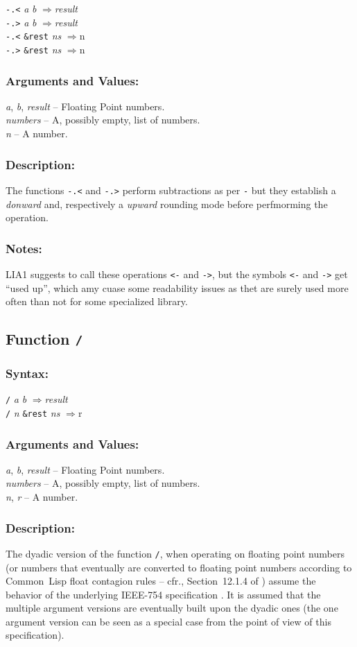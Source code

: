 \documentclass[10pt,fleqn]{article}
\newcommand{\CL}{\textsf{Common~Lisp}}
\newcommand{\code}[1]{\texttt{#1}}
\newcommand{\varname}[1]{\textit{#1}}
\newcommand{\RArrow}{$\Rightarrow$}
\newcommand{\IEEEFPStd}{IEEE-754}
\newcommand{\DDictionaryItem}[1]{\vspace*{6pt}\noindent\hrulefill\vspace*{-9pt}\subsection*{#1}}
\newcommand{\DSyntax}{\subsubsection*{Syntax:}}
\newcommand{\DArgsNValues}{\subsubsection*{Arguments and Values:}}
\newcommand{\DDescription}{\subsubsection*{Description:}}
\newcommand{\DNotes}{\subsubsection*{Notes:}}
\begin{document}
\code{-.<} \varname{a} \varname{b} \RArrow \varname{result}\\
\code{-.>} \varname{a} \varname{b} \RArrow \varname{result}\\
\code{-.<} \code{\&rest} \varname{ns} \RArrow \varname \code{n}\\
\code{-.>} \code{\&rest} \varname{ns} \RArrow \varname \code{n}\\

\DArgsNValues{}

\varname{a}, \varname{b}, \varname{result} -- Floating Point numbers.\\
\varname{numbers} -- A, possibly empty, list of numbers.\\
\varname{n} -- A number.

\DDescription{}

The functions  \code{-.<} and \code{-.>} perform subtractions as per \code{-}
but they establish a \emph{donward} and, respectively a
\emph{upward} rounding mode before perfmorming the operation.

\DNotes{}

LIA1 suggests to call these operations \code{<-} and \code{->}, but the symbols \code{<-}
and \code{->} get ``used up'', which amy cuase some readability issues
as thet are surely used more often than not for some specialized
library.


\DDictionaryItem{Function \code{/}}
\index{*!\code{/}}

\DSyntax{}

\code{/} \varname{a} \varname{b} \RArrow \varname{result}\\
\code{/} \varname{n} \code{\&rest} \varname{ns} \RArrow \varname \code{r}\\

\DArgsNValues{}

\varname{a}, \varname{b}, \varname{result} -- Floating Point numbers.\\
\varname{numbers} -- A, possibly empty, list of numbers.\\
\varname{n}, \varname{r} -- A number.



\DDescription{}

The dyadic version of the function \code{/}, when operating on
floating point numbers (or numbers that eventually are converted to
floating point numbers according to \CL{} float contagion rules -- cfr.,
Section~12.1.4 of \cite{1996:ANSIHyperSpec}) assume the behavior of the
underlying \IEEEFPStd{} specification \cite{2008:IEEE-754}.  It is assumed that
the multiple argument versions are eventually built upon the dyadic
ones (the one argument version can be seen as a special case from
the point of view of this specification).
\end{document}
